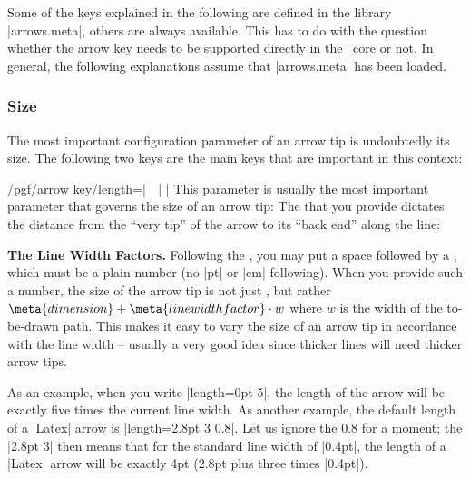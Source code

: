 Some of the keys explained in the following are defined in the library
|arrows.meta|, others are always available. This has to do with the
question whether the arrow key needs to be supported directly in the
\pgfname\ core or not. In general, the following explanations assume
that |arrows.meta| has been loaded.


\subsubsection{Size}

The most important configuration parameter of an arrow tip is
undoubtedly its size. The following two keys are the main keys that
are important in this context:

\begin{key}{/pgf/arrow key/length=| |%
    | |}
  \label{length-arrow-key}%
  This parameter is usually the most important parameter that governs
  the size of an arrow tip: The  that you provide
  dictates the distance from the ``very tip'' of the arrow to its
  ``back end'' along the line:
\begin{codeexample}[]
\end{codeexample}
\begin{codeexample}[]
\end{codeexample}
\begin{codeexample}[]
\end{codeexample}

  \medskip
  \noindent \textbf{The Line Width Factors.}
  Following the , you may put a space followed by a
  , which must be a plain number (no |pt| or
  |cm| following). When you provide such a number, the size of the
  arrow tip is not just , but rather $\meta{dimension}
  + \meta{line width factor}\cdot w$ where
  $w$ is the width of the to-be-drawn path. This
  makes it easy to vary the size of an arrow tip in accordance with
  the line width -- usually a very good idea since thicker lines will
  need thicker arrow tips. 

  As an example, when you write |length=0pt 5|, the length of the
  arrow will be exactly five times the current line width. As another
  example, the default length of a |Latex| arrow is
  |length=2.8pt 3 0.8|. Let us ignore the 0.8 for a moment; the
  |2.8pt 3| then means that for the standard line width of
  |0.4pt|, the length of a |Latex| arrow will be exactly 4pt (2.8pt
  plus three times |0.4pt|). 


\end{key}
